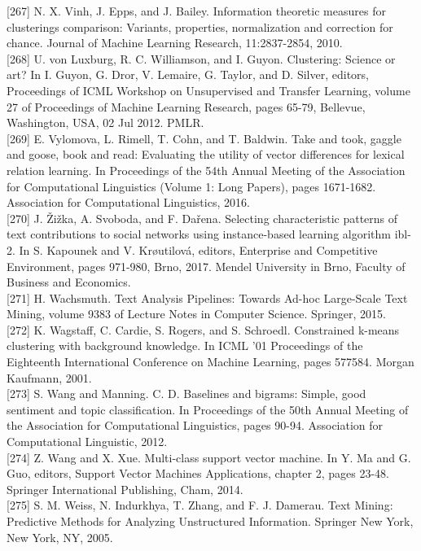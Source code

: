 \documentclass[10pt]{book}
\begin{document}
[267] N. X. Vinh, J. Epps, and J. Bailey. Information theoretic measures for clusterings comparison: Variants, properties, normalization and correction for chance. Journal of Machine Learning Research, 11:2837-2854, 2010.\\[0pt]
[268] U. von Luxburg, R. C. Williamson, and I. Guyon. Clustering: Science or art? In I. Guyon, G. Dror, V. Lemaire, G. Taylor, and D. Silver, editors, Proceedings of ICML Workshop on Unsupervised and Transfer Learning, volume 27 of Proceedings of Machine Learning Research, pages 65-79, Bellevue, Washington, USA, 02 Jul 2012. PMLR.\\[0pt]
[269] E. Vylomova, L. Rimell, T. Cohn, and T. Baldwin. Take and took, gaggle and goose, book and read: Evaluating the utility of vector differences for lexical relation learning. In Proceedings of the 54th Annual Meeting of the Association for Computational Linguistics (Volume 1: Long Papers), pages 1671-1682. Association for Computational Linguistics, 2016.\\[0pt]
[270] J. Žižka, A. Svoboda, and F. Dařena. Selecting characteristic patterns of text contributions to social networks using instance-based learning algorithm ibl-2. In S. Kapounek and V. Krøutilová, editors, Enterprise and Competitive Environment, pages 971-980, Brno, 2017. Mendel University in Brno, Faculty of Business and Economics.\\[0pt]
[271] H. Wachsmuth. Text Analysis Pipelines: Towards Ad-hoc Large-Scale Text Mining, volume 9383 of Lecture Notes in Computer Science. Springer, 2015.\\[0pt]
[272] K. Wagstaff, C. Cardie, S. Rogers, and S. Schroedl. Constrained k-means clustering with background knowledge. In ICML '01 Proceedings of the Eighteenth International Conference on Machine Learning, pages 577584. Morgan Kaufmann, 2001.\\[0pt]
[273] S. Wang and Manning. C. D. Baselines and bigrams: Simple, good sentiment and topic classification. In Proceedings of the 50th Annual Meeting of the Association for Computational Linguistics, pages 90-94. Association for Computational Linguistic, 2012.\\[0pt]
[274] Z. Wang and X. Xue. Multi-class support vector machine. In Y. Ma and G. Guo, editors, Support Vector Machines Applications, chapter 2, pages 23-48. Springer International Publishing, Cham, 2014.\\[0pt]
[275] S. M. Weiss, N. Indurkhya, T. Zhang, and F. J. Damerau. Text Mining: Predictive Methods for Analyzing Unstructured Information. Springer New York, New York, NY, 2005.\\[0pt]
\end{document}
